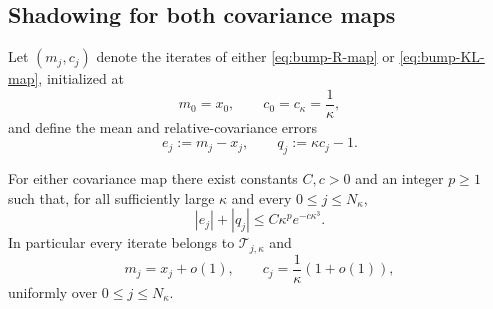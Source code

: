 \subsection{Shadowing for both covariance maps}

Let $(m_j,c_j)$ denote the iterates of either \eqref{eq:bump-R-map} or
\eqref{eq:bump-KL-map}, initialized at
\begin{equation}\label{eq:bump-init}
    m_0=x_0,
    \qquad
    c_0=c_\kappa=\frac1\kappa,
\end{equation}
and define the mean and relative-covariance errors
\begin{equation}\label{eq:shadow-errors}
    e_j:=m_j-x_j,
    \qquad
    q_j:=\kappa c_j-1 .
\end{equation}

\begin{lemma}\label{lem:bump-shadowing}
    For either covariance map there exist constants $C,c>0$ and an integer $p\geq1$ such that,
    for all sufficiently large $\kappa$ and every $0\leq j\leq N_\kappa$,
    \begin{equation}\label{eq:shadowing-estimate}
        |e_j|+|q_j|\leq C\kappa^pe^{-c\kappa^3}.
    \end{equation}
    In particular every iterate belongs to $\mathcal T_{j,\kappa}$ and
    \begin{equation}\label{eq:shadowing-conclusion}
        m_j=x_j+o(1),
        \qquad
        c_j=\frac1\kappa(1+o(1)),
    \end{equation}
    uniformly over $0\leq j\leq N_\kappa$.
\end{lemma}

